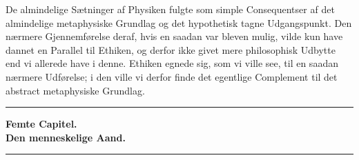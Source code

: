 \documentclass[12pt,a4paper]{book}
\begin{document}
De almindelige Sætninger af Physiken fulgte som simple
Consequentser af det almindelige metaphysiske Grundlag og
det hypothetisk tagne Udgangspunkt. Den nærmere Gjennemførelse
deraf, hvis en saadan var bleven mulig, vilde kun
have dannet en Parallel til Ethiken, og derfor ikke givet mere
philosophisk Udbytte end vi allerede have i denne. Ethiken
egnede sig, som vi ville see, til en saadan nærmere Udførelse;
i den ville vi derfor finde det egentlige Complement til det
abstract metaphysiske Grundlag.

\bigskip
\begin{center}\rule{2.5cm}{0.4pt}\end{center}
\bigskip

\begin{center}
{\large\textbf{Femte Capitel.}}\\[4pt]
\textbf{Den menneskelige Aand.}\\[6pt]
\rule{2cm}{0.4pt}
\end{center}
\bigskip
\end{document}
